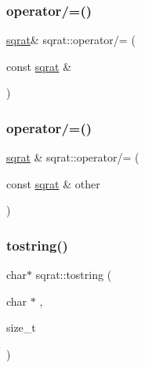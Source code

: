 \mbox{\label{classsqrat_a348781af63f0a423ad0a84342fdccb49}} 
\subsubsection{\texorpdfstring{operator/=()}{operator/=()}\hspace{0.1cm}{\footnotesize\ttfamily [1/2]}}
{\footnotesize\ttfamily \mbox{\hyperlink{classsqrat}{sqrat}}\& sqrat\+::operator/= (\begin{DoxyParamCaption}\item[{const \mbox{\hyperlink{classsqrat}{sqrat}} \&}]{ }\end{DoxyParamCaption})}

\mbox{\label{classsqrat_a7c53e1f92b41f58404701af587d4e71a}} 
\subsubsection{\texorpdfstring{operator/=()}{operator/=()}\hspace{0.1cm}{\footnotesize\ttfamily [2/2]}}
{\footnotesize\ttfamily \mbox{\hyperlink{classsqrat}{sqrat}} \& sqrat\+::operator/= (\begin{DoxyParamCaption}\item[{const \mbox{\hyperlink{classsqrat}{sqrat}} \&}]{other }\end{DoxyParamCaption})}

\mbox{\label{classsqrat_a0e94b27cf419cf8888da52e854f9d60b}} 
\subsubsection{\texorpdfstring{tostring()}{tostring()}\hspace{0.1cm}{\footnotesize\ttfamily [1/2]}}
{\footnotesize\ttfamily char$\ast$ sqrat\+::tostring (\begin{DoxyParamCaption}\item[{char $\ast$}]{,  }\item[{size\+\_\+t}]{ }\end{DoxyParamCaption})}

\mbox{\label{classsqrat_a001bc36694a9213a62c22c8d8bebbec2}} 

